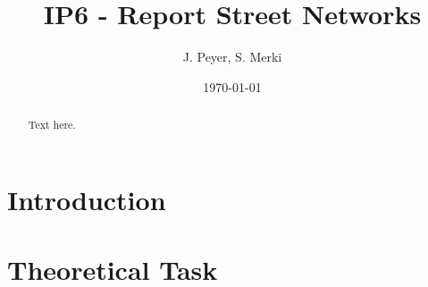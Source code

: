 \documentclass[11pt, a4paper]{report}
\begin{document}
\begin{titlepage}
    \title{IP6 - Report Street Networks}
    \date{\today}
    \author{J. Peyer, S. Merki}
    \maketitle
\end{titlepage}
\setcounter{page}{1}

\tableofcontents



\begin{abstract}
    Text here.
\end{abstract}

\chapter{Introduction}

\chapter{Theoretical Task}
\end{document}
